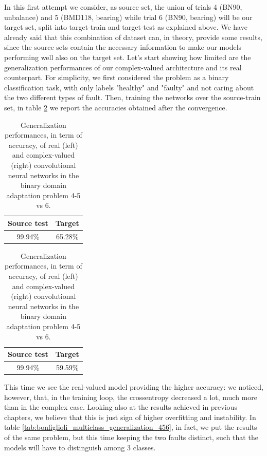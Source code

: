 \documentclass[../main.tex]{subfiles}
\begin{document}
In this first attempt we consider, as source set, the union of trials 4 (BN90, unbalance) and 5 (BMD118, bearing) while trial 6 (BN90, bearing) will be our target set, split into target-train and target-test as explained above. We have already said that this combination of dataset can, in theory, provide some results, since the source sets contain the necessary information to make our models performing well also on the target set. Let's start showing how limited are the generalization performances of our complex-valued architecture and its real counterpart. For simplicity, we first considered the problem as a binary classification task, with only labels "healthy" and "faulty" and not caring about the two different types of fault. Then, training the networks over the source-train set, in table \ref{tab:bonfiglioli_binary_generalization_456} we report the accuracies obtained after the convergence.
\begin{table}[!ht]
	\centering
	\begin{minipage}{.45\linewidth}
		\begin{tabular}{c c}
			\textbf{Source test} & \textbf{Target}\\
			\midrule
			99.94\% & 65.28\% \\			
		\end{tabular}
	\end{minipage}
	\begin{minipage}{.45\linewidth}
		\begin{tabular}{c c}
			\textbf{Source test} & \textbf{Target}\\
			\midrule
			99.94\% & 59.59\% \\			
		\end{tabular}
	\end{minipage}
	\caption{Generalization performances, in term of accuracy, of real (left) and complex-valued (right) convolutional neural networks in the binary domain adaptation problem 4-5 vs 6.}
	\label{tab:bonfiglioli_binary_generalization_456}
\end{table}
This time we see the real-valued model providing the higher accuracy: we noticed, however, that, in the training loop, the crossentropy decreased a lot, much more than in the complex case. Looking also at the results achieved in previous chapters, we believe that this is just sign of higher overfitting and instability. In table \ref{tab:bonfiglioli_multiclass_generalization_456}, in fact, we put the results of the same problem, but this time keeping the two faults distinct, such that the models will have to distinguish among 3 classes.
\end{document}
